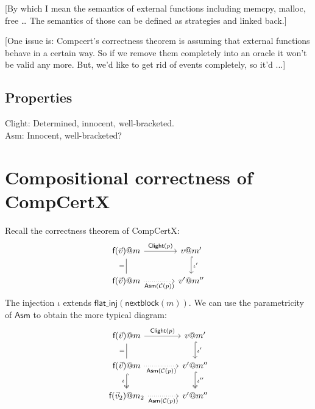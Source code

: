 \documentclass[acmsmall,anonymous]{acmart}
\makeatletter
\newcommand{\kw}[1]{\ensuremath{ \textsf{#1} }}
\newcommand{\mcall}[3]{\kw{#1}({#2})@{#3}}
\newcommand{\mret}[2]{{#1}@{#2}}
\makeatother
\begin{document}
[By which I mean the semantics of external functions
including memcpy, malloc, free \ldots
The semantics of those can be defined as strategies
and linked back.]

[One issue is:
Compcert's correctness theorem is
assuming that external functions behave in a certain way.
So if we remove them completely into an oracle
it won't be valid any more.
But,
we'd like to get rid of events completely,
so it'd ...]


\subsection{Properties} %

Clight: Determined, innocent, well-bracketed. \\
Asm: Innocent, well-bracketed?



\newpage
\section{Compositional correctness of CompCertX} %

Recall the correctness theorem of CompCertX:
\[
  \begin{tikzcd}[column sep=large]
    \mcall{f}{\vec{v}}{m}
      \arrow[r, "\kw{Clight}(p)"]
      \arrow[d, dash, "="'] &
    \mret{v}{m'}
      \arrow[d, hookrightarrow, "\iota'"] \\
    \mcall{f}{\vec{v}}{m}
      \arrow[r, dotted, "\kw{Asm}(\mathcal{C}(p))"'] &
    \mret{v'}{m''}
  \end{tikzcd}
\]
The injection $\iota$
extends $\kw{flat\_inj}(\kw{nextblock}(m))$.
We can use the parametricity of $\kw{Asm}$
to obtain the more typical diagram:
\[
  \begin{tikzcd}[column sep=large]
    \mcall{f}{\vec{v}}{m}
      \arrow[r, "\kw{Clight}(p)"]
      \arrow[d, dash, "="'] &
    \mret{v}{m'}
      \arrow[d, hookrightarrow, "\iota'"] \\
    \mcall{f}{\vec{v}}{m}
      \arrow[r, dotted, "\kw{Asm}(\mathcal{C}(p))"']
      \arrow[d, hookrightarrow, two heads, "\iota"'] &
    \mret{v'}{m''}
      \arrow[d, hookrightarrow, two heads, "\iota''"] \\
    \mcall{f}{\vec{v}_2}{m_2}
      \arrow[r, dotted, "\kw{Asm}(\mathcal{C}(p))"'] &
    \mret{v'}{m''}
  \end{tikzcd}
\]
\end{document}

